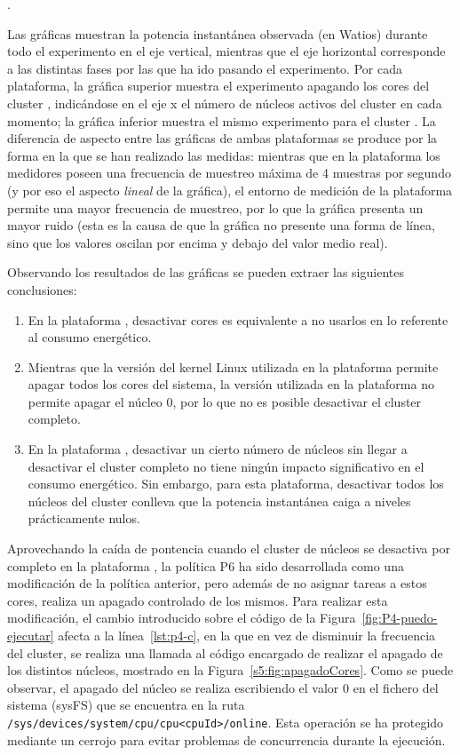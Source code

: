 .

Las gráficas muestran la potencia instantánea observada (en Watios) durante todo el
experimento en el eje vertical, mientras que el eje horizontal corresponde
a las distintas fases por las que ha ido pasando el experimento. Por cada
plataforma, la gráfica superior muestra el experimento apagando los cores
del cluster \BIG, indicándose en el eje x el número de núcleos activos del
cluster en cada momento; la gráfica inferior muestra el mismo
experimento para el cluster \LITTLE. La diferencia de aspecto entre las
gráficas de ambas plataformas se produce por la forma en la que se han
realizado las medidas: mientras que en la plataforma \odroid los medidores
poseen una frecuencia de muestreo máxima de 4 muestras por segundo (y por
eso el aspecto \emph{lineal} de la gráfica), el entorno de medición de la
plataforma \juno permite una mayor frecuencia de muestreo, por lo que la
gráfica presenta un mayor ruido (esta es la causa de que la gráfica no
presente una forma de línea, sino que los valores oscilan por encima y
debajo del valor medio real).

Observando los resultados de las gráficas se pueden extraer las siguientes
conclusiones:

\begin{enumerate}
\item En la plataforma \juno, desactivar cores es equivalente a no usarlos
  en lo referente al consumo energético.
\item Mientras que la versión del kernel Linux utilizada en la plataforma
  \juno permite apagar todos los cores del sistema, la versión utilizada en
  la plataforma \odroid no permite apagar el núcleo 0, por lo que no es
  posible desactivar el cluster \LITTLE completo.
\item En la plataforma \odroid, desactivar un cierto número de núcleos sin
  llegar a desactivar el cluster completo no tiene ningún impacto
  significativo en el consumo energético. Sin embargo, para esta
  plataforma, desactivar todos los núcleos del cluster \BIG conlleva que 
		la potencia instantánea caiga a niveles prácticamente nulos.
\end{enumerate}


Aprovechando la caída de pontencia cuando el cluster de
núcleos \BIG se desactiva por completo en la plataforma \odroid, la política
P6 ha sido desarrollada como una modificación de la política anterior, pero
además de no asignar tareas a estos cores, realiza un apagado controlado de
los mismos. Para realizar esta modificación, el cambio introducido sobre el
código de la Figura~\ref{fig:P4-puedo-ejecutar} afecta a la
línea~\ref{lst:p4-c}, en la que en vez de disminuir la frecuencia del
cluster, se realiza una llamada al código encargado de realizar el apagado
de los distintos núcleos, mostrado en la
Figura~\ref{s5:fig:apagadoCores}. Como se puede observar, el apagado del
núcleo se realiza escribiendo el valor 0 en el fichero del sistema ({\sc sysFS}) que se
encuentra en la ruta
\texttt{/sys/devices/system/cpu/cpu<cpuId>/online}. Esta operación se ha protegido
mediante un cerrojo para evitar problemas de concurrencia
durante la ejecución.



